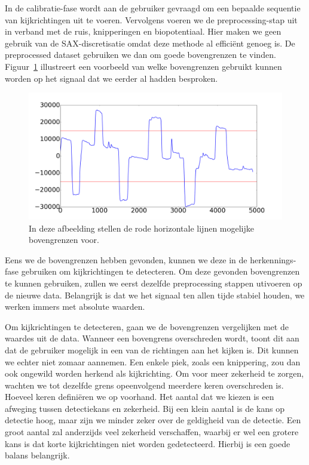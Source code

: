 \documentclass{article}
\begin{document}
In de calibratie-fase wordt aan de gebruiker gevraagd om een bepaalde sequentie van kijkrichtingen uit te voeren. Vervolgens voeren we de preprocessing-stap uit in verband met de ruis, knipperingen en biopotentiaal. Hier maken we geen gebruik van de SAX-discretisatie omdat deze methode al efficiënt genoeg is. De preprocessed dataset gebruiken we dan om goede bovengrenzen te vinden. Figuur~\ref{fig:thresholds} illustreert een voorbeeld van welke bovengrenzen gebruikt kunnen worden op het signaal dat we eerder al hadden besproken.

\begin{figure}[h]
\centering
\includegraphics[width=\linewidth]{images/thresholds_voorbeeld}
\caption{In deze afbeelding stellen de rode horizontale lijnen mogelijke bovengrenzen voor.}
 \label{fig:thresholds}
\end{figure}

Eens we de bovengrenzen hebben gevonden, kunnen we deze in de herkennings-fase gebruiken om kijkrichtingen te detecteren. Om deze gevonden bovengrenzen te kunnen gebruiken, zullen we eerst dezelfde preprocessing stappen utivoeren op de nieuwe data. Belangrijk is dat we het signaal ten allen tijde stabiel houden, we werken immers met absolute waarden.

Om kijkrichtingen te detecteren, gaan we de bovengrenzen vergelijken met de waardes uit de data. Wanneer een bovengrens overschreden wordt, toont dit aan dat de gebruiker mogelijk in een van de richtingen aan het kijken is. Dit kunnen we echter niet zomaar aannemen. Een enkele piek, zoals een knippering, zou dan ook ongewild worden herkend als kijkrichting. Om voor meer zekerheid te zorgen, wachten we tot dezelfde grens opeenvolgend meerdere keren overschreden is. Hoeveel keren definiëren we op voorhand. Het aantal dat we kiezen is een afweging tussen detectiekans en zekerheid. Bij een klein aantal is de kans op detectie hoog, maar zijn we minder zeker over de geldigheid van de detectie. Een groot aantal zal anderzijds veel zekerheid verschaffen, waarbij er wel een grotere kans is dat korte kijkrichtingen niet worden gedetecteerd. Hierbij is een goede balans belangrijk.
\end{document}
